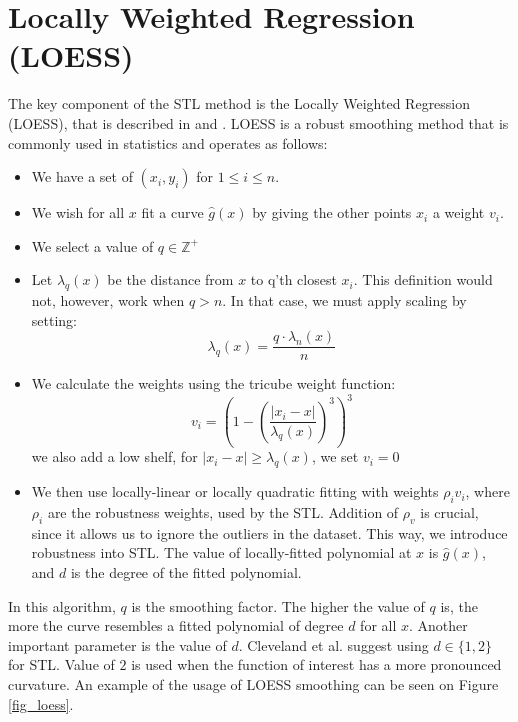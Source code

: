 \documentclass[main.tex]{subfiles}
\begin{document}
\section{Locally Weighted Regression (LOESS)}
\label{sec:locally_weighted_running_line_smoother}
The key component of the STL method is the Locally Weighted Regression (LOESS),
that is described in \cite{loess} and \cite{stl}. LOESS is a robust smoothing method that is
commonly used in statistics and operates as follows:
\begin{itemize}
\item We have a set of $(x_i, y_i)$ for $1 \leq i \leq n$.
\item We wish for all $x$ fit a curve $\hat{g}(x)$ by giving the other points $x_i$ a
  weight $v_i$.
\item We select a value of $q \in \mathbb{Z}^+$
\item Let $\lambda_q(x)$ be the distance from $x$ to q'th closest $x_i$.
  This definition would not, however, work when $q > n$. In that case, we must
  apply scaling by setting:
  \[
  \lambda_q(x) = \frac{q \cdot \lambda_n(x)}{n}
  \]
\item We calculate the weights using the tricube weight function:
  \[
  v_i = \left( 1 - \left( \frac{| x_i - x |}{\lambda_q(x)}  \right)^3\right)^3
  \]
  we also add a low shelf, for $| x_i - x | \geq \lambda_q(x)$, we set $v_i = 0$
\item We then use locally-linear or locally quadratic fitting with weights
  $\rho_i v_i$, where $\rho_i$ are the robustness weights, used by the STL.
  Addition of $\rho_v$ is crucial, since it allows us to ignore the outliers
  in the dataset. This way, we introduce robustness into STL.
  The value of locally-fitted polynomial at $x$ is $\hat{g}(x)$, and $d$ is
  the degree of the fitted polynomial.
\end{itemize}
In this algorithm, $q$ is the smoothing factor. The higher the value of $q$ is, the more
the curve resembles a fitted polynomial of degree $d$ for all $x$. Another
important parameter is the value of $d$. Cleveland et al.
\cite{stl} suggest using $d \in \{1,2\}$ for STL. Value of $2$ is used when the
function of interest has a more pronounced curvature. An example of the usage of
LOESS smoothing can be seen on Figure \ref{fig_loess}.
\end{document}
